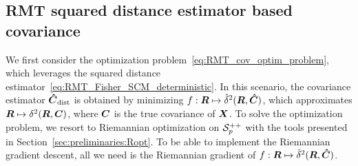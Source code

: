 \documentclass{article}
\theoremstyle{plain}
\theoremstyle{definition}
\theoremstyle{remark}
\begin{document}
\subsection{RMT squared distance estimator based covariance}
\label{sec:cov:algo}
We first consider the optimization problem~\eqref{eq:RMT_cov_optim_problem}, which leverages the squared distance estimator~\eqref{eq:RMT_Fisher_SCM_deterministic}.
In this scenario, the covariance estimator $\boldsymbol{\hat{C}}_{\textup{dist}}$ is obtained by minimizing $f:\boldsymbol{R}\mapsto\hat{\delta}^2(\boldsymbol{R},\boldsymbol{\hat{C}})$, which approximates $\boldsymbol{R}\mapsto\delta^2(\boldsymbol{R},\boldsymbol{C})$, where $\boldsymbol{C}$ is the true covariance of $\boldsymbol{X}$.
%
To solve the optimization problem, we resort to Riemannian optimization on $\mathcal{S}^{++}_{p}$ with the tools presented in Section~\ref{sec:preliminaries:Ropt}.
To be able to implement the Riemannian gradient descent, all we need is the Riemannian gradient of $f:\boldsymbol{R}\mapsto\hat{\delta}^2(\boldsymbol{R},\boldsymbol{\hat{C}})$.
\end{document}
